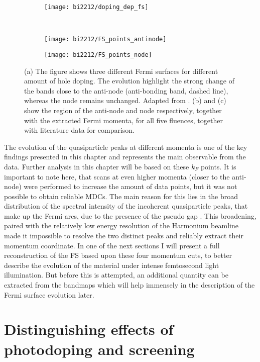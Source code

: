 \begin{figure}[b!]
	\centering
	\begin{subfigure}[b]{\textwidth}
		\texttt{[image: bi2212/doping\_dep\_fs]}
		\caption{}
	\end{subfigure}
	\\
	\begin{subfigure}[b]{0.49\textwidth}
		\texttt{[image: bi2212/FS\_points\_antinode]}
		\caption{}
	\end{subfigure}
	\hfill
	\begin{subfigure}[b]{0.49\textwidth}
		\texttt{[image: bi2212/FS\_points\_node]}
		\caption{}
	\end{subfigure}
	\caption{(a) The figure shows three different Fermi surfaces for different amount of hole doping. The evolution highlight the strong change of the bands close to the anti-node (anti-bonding band, dashed line), whereas the node remains unchanged. Adapted from \cite{drozdov_phase_2018}. (b) and (c) show the region of the anti-node and node respectively, together with the extracted Fermi momenta, for all five fluences, together with literature data for comparison.}
	\label{fig:FS_points_zoom}
\end{figure}

The evolution of the quasiparticle peaks at different momenta is one of the key findings presented in this chapter and represents the main observable from the data.
Further analysis in this chapter will be based on these $k_F$ points.
It is important to note here, that scans at even higher momenta (closer to the anti-node) were performed to increase the amount of data points, but it was not possible to obtain reliable MDCs.
The main reason for this lies in the broad distribution of the spectral intensity of the incoherent quasiparticle peaks, that make up the Fermi arcs, due to the presence of the pseudo gap \cite{norman_destruction_1998}.
This broadening, paired with the relatively low energy resolution of the Harmonium beamline made it impossible to resolve the two distinct peaks and reliably extract their momentum coordinate.
In one of the next sections I will present a full reconstruction of the FS based upon these four momentum cuts, to better describe the evolution of the material under intense femtosecond light illumination.
But before this is attempted, an additional quantity can be extracted from the bandmaps which will help immensely in the description of the Fermi surface evolution later.


\section{Distinguishing effects of photodoping and screening}
\label{sec:mu}

